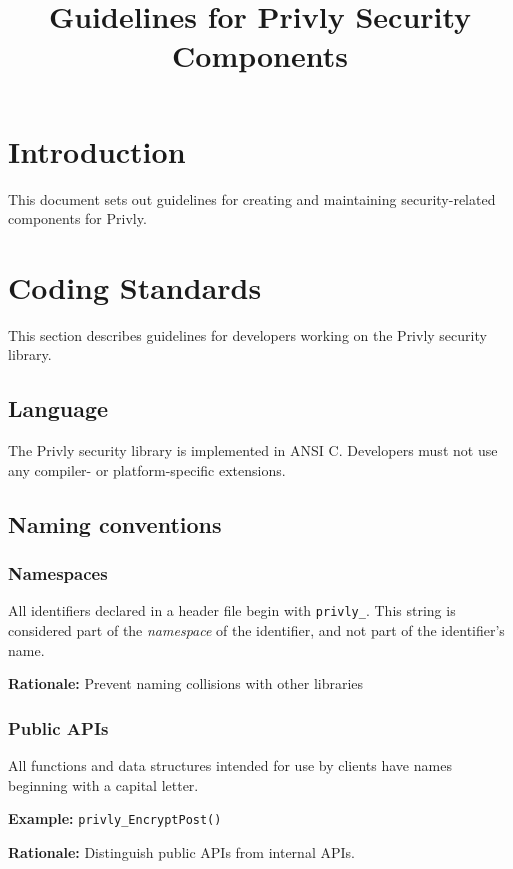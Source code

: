 \documentclass[]{article}
\title{Guidelines for Privly Security Components}
\begin{document}
\maketitle

\section{Introduction}
This document sets out guidelines for creating and maintaining security-related components for Privly. 

\section{Coding Standards}
This section describes guidelines for developers working on the Privly security library.

\subsection{Language}
The Privly security library is implemented in ANSI C. Developers must not use any compiler- or platform-specific extensions.


\subsection{Naming conventions}
\subsubsection{Namespaces} All identifiers declared in a header file begin with \verb'privly_'. This string is considered part of the \emph{namespace} of the identifier, and not part of the identifier's name.

\textbf{Rationale:} Prevent naming collisions with other libraries

\subsubsection{Public APIs} All functions and data structures intended for use by clients have names beginning with a capital letter.

\textbf{Example:} \verb'privly_EncryptPost()'

\textbf{Rationale:} Distinguish public APIs from internal APIs.

\end{document}
